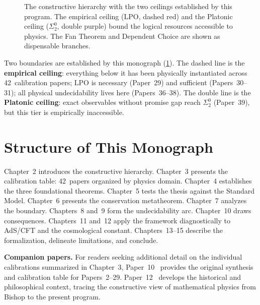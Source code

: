 \documentclass[11pt,a4paper]{report}
\theoremstyle{plain}
\theoremstyle{definition}
\theoremstyle{remark}
\newcommand{\LPO}{\mathrm{LPO}}
\begin{document}
\begin{figure}[t]
\caption{The constructive hierarchy with the two ceilings established by this program. The empirical ceiling ($\LPO$, dashed red) and the Platonic ceiling ($\Sigma^0_2$, double purple) bound the logical resources accessible to physics. The Fan Theorem and Dependent Choice are shown as dispensable branches.}
\label{fig:hierarchy}
\end{figure}

Two boundaries are established by this monograph (\cref{fig:hierarchy}). The dashed line is the \textbf{empirical ceiling}: everything below it has been physically instantiated across 42~calibration papers; $\LPO$ is necessary (Paper~29) and sufficient (Papers~30--31); all physical undecidability lives here (Papers~36--38). The double line is the \textbf{Platonic ceiling}: exact observables without promise gap reach $\Sigma^0_2$ (Paper~39), but this tier is empirically inaccessible.

\section{Structure of This Monograph}

Chapter~2 introduces the constructive hierarchy. Chapter~3 presents the calibration table: 42~papers organized by physics domain. Chapter~4 establishes the three foundational theorems. Chapter~5 tests the thesis against the Standard Model. Chapter~6 presents the conservation metatheorem. Chapter~7 analyzes the boundary. Chapters~8 and~9 form the undecidability arc. Chapter~10 draws consequences. Chapters~11 and~12 apply the framework diagnostically to AdS/CFT and the cosmological constant. Chapters~13--15 describe the formalization, delineate limitations, and conclude.

\medskip\noindent
\textbf{Companion papers.}\quad
For readers seeking additional detail on the individual calibrations summarized in Chapter~3, Paper~10~\cite{Lee2026P10} provides the original synthesis and calibration table for Papers~2--29. Paper~12~\cite{Lee2026P12} develops the historical and philosophical context, tracing the constructive view of mathematical physics from Bishop to the present program.
\end{document}
